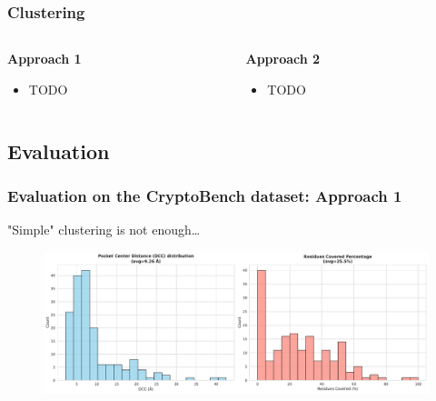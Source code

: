 \documentclass[aspectratio=169]{beamer}
\begin{document}
\begin{frame}
  \frametitle{Clustering}

  \begin{columns}
    \begin{column}{0.5\textwidth}
      \textbf{Approach 1}
      \begin{itemize}
        \item TODO
      \end{itemize}
    \end{column}
    \begin{column}{0.5\textwidth}
      \textbf{Approach 2}
      \begin{itemize}
        \item TODO
      \end{itemize}
    \end{column}
  \end{columns}

\end{frame}

\subsection{Evaluation}

\begin{frame}
  \frametitle{Evaluation on the CryptoBench dataset: Approach 1}

  "Simple" clustering is not enough\dots

  \begin{figure}
    \includegraphics[width=\textwidth]{fig/non-smoothened-1.pdf}
  \end{figure}
\end{frame}
\end{document}
